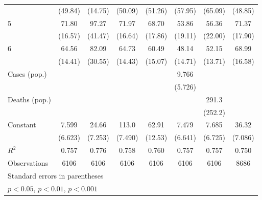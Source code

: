 \documentclass{article}
\begin{document}
{\begin{longtable}{l*{7}{c}}
                &  (49.84)         &  (14.75)         &  (50.09)         &  (51.26)         &  (57.95)         &  (65.09)         &  (48.85)         \\
5               &    71.80\sym{***}&    97.27\sym{*}  &    71.97\sym{***}&    68.70\sym{***}&    53.86\sym{**} &    56.36\sym{*}  &    71.37\sym{***}\\
                &  (16.57)         &  (41.47)         &  (16.64)         &  (17.86)         &  (19.11)         &  (22.00)         &  (17.90)         \\
6               &    64.56\sym{***}&    82.09\sym{*}  &    64.73\sym{***}&    60.49\sym{***}&    48.14\sym{**} &    52.15\sym{***}&    68.99\sym{***}\\
                &  (14.41)         &  (30.55)         &  (14.43)         &  (15.07)         &  (14.71)         &  (13.71)         &  (16.58)         \\
Cases (pop.)    &                  &                  &                  &                  &    9.766         &                  &                  \\
                &                  &                  &                  &                  &  (5.726)         &                  &                  \\
Deaths (pop.)   &                  &                  &                  &                  &                  &    291.3         &                  \\
                &                  &                  &                  &                  &                  &  (252.2)         &                  \\
Constant        &    7.599         &    24.66\sym{**} &    113.0\sym{***}&    62.91\sym{***}&    7.479         &    7.685         &    36.32\sym{***}\\
                &  (6.623)         &  (7.253)         &  (7.490)         &  (12.53)         &  (6.641)         &  (6.725)         &  (7.086)         \\
\hline
\(R^{2}\)       &    0.757         &    0.776         &    0.758         &    0.760         &    0.757         &    0.757         &    0.750         \\
Observations    &     6106         &     6106         &     6106         &     6106         &     6106         &     6106         &     8686         \\
\hline\hline
\multicolumn{8}{l}{\footnotesize Standard errors in parentheses}\\
\multicolumn{8}{l}{\footnotesize \sym{*} \(p<0.05\), \sym{**} \(p<0.01\), \sym{***} \(p<0.001\)}\\
\end{longtable}
}
\end{document}
